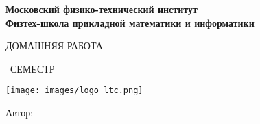 \begin{titlepage}
	\clearpage\thispagestyle{empty}
	\centering
	
	\textbf{Московский физико-технический институт \\ Физтех-школа прикладной математики и информатики}
	\vspace{33ex}
	
	{\textbf{\FullCourseNameFirstPart}}
	
	ДОМАШНЯЯ РАБОТА
	
	\SemesterNumber\ СЕМЕСТР  
	\vspace{1ex}
	
	
	\texttt{[image: images/logo\_ltc.png]}
	
	\begin{flushright}
		\noindent
		Автор: \href{\VKLink}{\textit{\AuthorInitials}}
		\\
	\end{flushright}
	
	\vfill
	\CourseDate
	\pagebreak
\end{titlepage}
